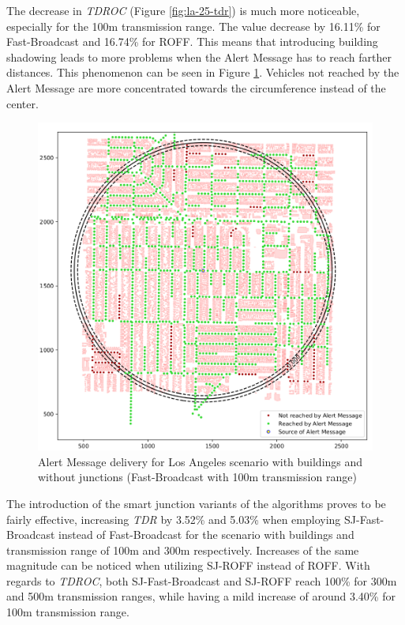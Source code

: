 		
		The decrease in \textit{TDROC} (Figure \ref{fig:la-25-tdr}) is much more noticeable, especially for the 100m transmission range. The value decrease by 16.11\% for Fast-Broadcast and 16.74\% for ROFF. This means that introducing building shadowing leads to more problems when the Alert Message has to reach farther distances. This phenomenon can be seen in Figure \ref{fig:la-coverage-fb100}.
		Vehicles not reached by the Alert Message are more concentrated towards the circumference instead of the center.
		
		\begin{figure}[H]
			\centering
			\includegraphics[width=1.0\textwidth]{immagini/la-25/la-coverage-fb100}
			\caption{Alert Message delivery for Los Angeles scenario with buildings and without junctions (Fast-Broadcast with 100m transmission range)}
			\label{fig:la-coverage-fb100}
		\end{figure}
		
		The introduction of the smart junction variants of the algorithms proves to be fairly effective, increasing \textit{TDR} by 3.52\% and 5.03\% when employing SJ-Fast-Broadcast instead of Fast-Broadcast for the scenario with buildings and transmission range of 100m and 300m respectively. Increases of the same magnitude can be noticed when utilizing SJ-ROFF instead of ROFF. With regards to \textit{TDROC}, both SJ-Fast-Broadcast and SJ-ROFF reach 100\% for 300m and 500m transmission ranges, while having a mild increase of around 3.40\% for 100m transmission range.
		
